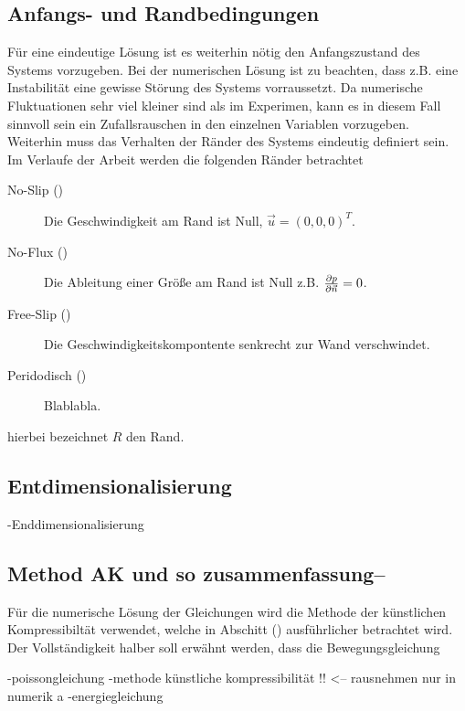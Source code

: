 \subsection{Anfangs- und Randbedingungen}
Für eine eindeutige Lösung ist es weiterhin nötig den Anfangszustand des Systems vorzugeben.
Bei der numerischen Lösung ist zu beachten, dass z.B. eine Instabilität eine gewisse Störung des Systems vorraussetzt.
Da numerische Fluktuationen sehr viel kleiner sind als im Experimen, kann es in diesem Fall sinnvoll sein
ein Zufallsrauschen in den einzelnen Variablen vorzugeben.
Weiterhin muss das Verhalten der Ränder des Systems eindeutig definiert sein.
Im Verlaufe der Arbeit werden die folgenden Ränder betrachtet
\begin{description}
    \item[No-Slip ()] Die Geschwindigkeit am Rand ist Null, $\vec{u} = (0, 0, 0)^T$.
    \item[No-Flux ()] Die Ableitung einer Größe am Rand ist Null z.B. $\pdn[p]{\vec{n}} = 0$.
    \item[Free-Slip ()] Die Geschwindigkeitskompontente senkrecht zur Wand verschwindet.
    \item[Peridodisch ()] Blablabla.
\end{description}
hierbei bezeichnet $R$ den Rand.

\subsection{Entdimensionalisierung}

-Enddimensionalisierung

\subsection{Method AK  und so zusammenfassung--}


Für die numerische Lösung der Gleichungen wird die Methode der künstlichen Kompressibiltät verwendet, welche in Abschitt ()
ausführlicher betrachtet wird. Der Vollständigkeit halber soll erwähnt werden, dass die Bewegungsgleichung






-poissongleichung
-methode künstliche kompressibilität !! <-- rausnehmen nur in numerik
a
-energiegleichung


